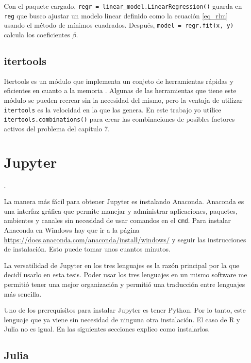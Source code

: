 Con el paquete cargado, \texttt{regr = linear\_model.LinearRegression()} guarda en \texttt{reg} que busco ajustar un modelo linear definido como la ecuación \ref{eq_rlm} usando el método de mínimos cuadrados. Después, \texttt{model = regr.fit(x, y)} calcula los coeficientes $\beta$. 

\subsection{itertools}
Itertools es un módulo que implementa un conjeto de herramientas rápidas y eficientes en cuanto a la memoria \cite{doc_python}. Algunas de las herramientas que tiene este módulo se pueden recrear sin la necesidad del mismo, pero la ventaja de utilizar \texttt{itertools} es la velocidad en la que las genera. En este trabajo yo utilice \texttt{itertools.combinations()} para crear las combinaciones de posibles factores activos del problema del capítulo 7. 


\section{Jupyter}
 \cite{jupyter_page}. 

La manera más fácil para obtener Jupyter es instalando Anaconda. Anaconda es una interfaz gráfica que permite manejar y administrar aplicaciones, paquetes, ambientes y canales sin necesidad de usar comandos en el \texttt{cmd}. Para instalar Anaconda en Windows hay que ir a la página \url{https://docs.anaconda.com/anaconda/install/windows/} y seguir las instrucciones de instalación. Esto puede tomar unos cuantos minutos. 

La versatilidad de Jupyter en los tres lenguajes es la razón principal por la que decidí usarlo en esta tesis. Poder usar los tres lenguajes en un mismo software me permitió tener una mejor organización y permitió una traducción entre lenguajes más sencilla. 

Uno de los prerequisitos para instalar Jupyter es tener Python. Por lo tanto, este lenguaje que ya viene sin necesidad de ninguna otra instalación. El caso de R y Julia no es igual. En las siguientes secciones explico como instalarlos.

\subsection{Julia}

